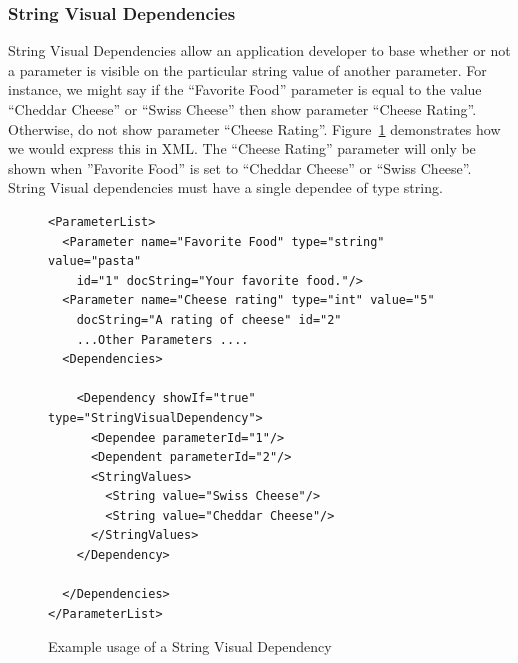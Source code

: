 \subsubsection{String Visual Dependencies}
String Visual Dependencies allow an application developer to base whether or not a parameter is visible on the particular string value of another
parameter. For instance, we might say if the ``Favorite Food'' parameter  is equal to the value ``Cheddar Cheese'' or ``Swiss Cheese'' then show parameter ``Cheese Rating''. 
Otherwise, do not show parameter ``Cheese Rating''. Figure~\ref{StringVisXML} demonstrates how we would express this in XML. The 
``Cheese Rating'' parameter will only be shown when ''Favorite Food'' is set to ``Cheddar Cheese'' or ``Swiss Cheese''. String Visual dependencies must have a single 
dependee of type string. 
\begin{figure}
\centering
{\footnotesize
\begin{verbatim}
<ParameterList>
  <Parameter name="Favorite Food" type="string" value="pasta"
    id="1" docString="Your favorite food."/>
  <Parameter name="Cheese rating" type="int" value="5"
    docString="A rating of cheese" id="2"
    ...Other Parameters ....
  <Dependencies>

    <Dependency showIf="true" type="StringVisualDependency">
      <Dependee parameterId="1"/>
      <Dependent parameterId="2"/>
      <StringValues>
        <String value="Swiss Cheese"/>
        <String value="Cheddar Cheese"/>
      </StringValues>
    </Dependency>

  </Dependencies>
</ParameterList>
\end{verbatim}
}
\caption{Example usage of a String Visual Dependency}
\label{StringVisXML}
\end{figure}

